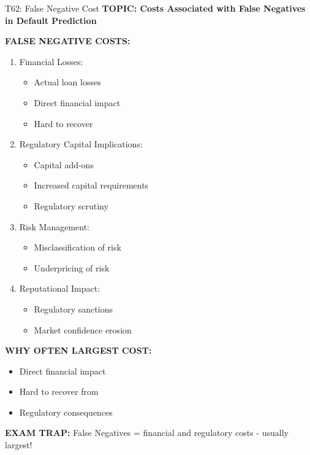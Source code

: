 \documentclass[8pt]{beamer}
\begin{document}
	\begin{frame}{T62: False Negative Cost}
		\fontsize{6.5}{7.5}\selectfont
		\textbf{TOPIC: Costs Associated with False Negatives in Default Prediction}
		
		\vspace{0.1cm}
		\textbf{FALSE NEGATIVE COSTS:}
		\begin{enumerate}
			\item \textcolor{myblue}{Financial Losses:}
			\begin{itemize}
				\item Actual loan losses
				\item Direct financial impact
				\item Hard to recover
			\end{itemize}
			
			\item \textcolor{myblue}{Regulatory Capital Implications:}
			\begin{itemize}
				\item Capital add-ons
				\item Increased capital requirements
				\item Regulatory scrutiny
			\end{itemize}
			
			\item \textcolor{myblue}{Risk Management:}
			\begin{itemize}
				\item Misclassification of risk
				\item Underpricing of risk
			\end{itemize}
			
			\item \textcolor{myblue}{Reputational Impact:}
			\begin{itemize}
				\item Regulatory sanctions
				\item Market confidence erosion
			\end{itemize}
		\end{enumerate}
		
		\vspace{0.1cm}
		\textbf{WHY OFTEN LARGEST COST:}
		\begin{itemize}
			\item Direct financial impact
			\item Hard to recover from
			\item Regulatory consequences
		\end{itemize}
		
		\textcolor{myred}{\textbf{EXAM TRAP:}} False Negatives = \textcolor{myblue}{financial and regulatory costs} - usually largest!
	\end{frame}
	
\end{document}

